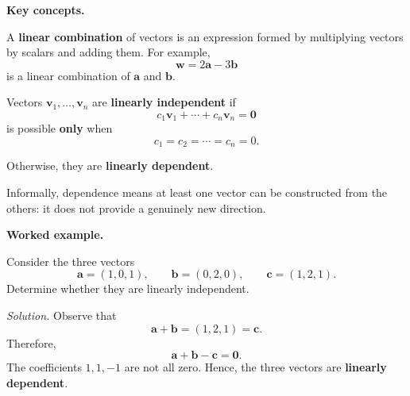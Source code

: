 \begingroup
\small

\noindent{}

\vspace{0.8em}

\noindent\textbf{Key concepts.}

A \textbf{linear combination} of vectors is an expression formed by
multiplying vectors by scalars and adding them.
For example,
\[
  \mathbf{w} = 2\mathbf{a} - 3\mathbf{b}
\]
is a linear combination of $\mathbf{a}$ and $\mathbf{b}$.

\vspace{0.4em}
Vectors $\mathbf{v}_1, \ldots, \mathbf{v}_n$ are
\textbf{linearly independent} if
\[
  \boxed{
  c_1 \mathbf{v}_1 + \cdots + c_n \mathbf{v}_n = \mathbf{0}
  }
\]
is possible \textbf{only} when
\[
  c_1 = c_2 = \cdots = c_n = 0.
\]

Otherwise, they are \textbf{linearly dependent}.

\vspace{0.4em}
Informally, dependence means at least one vector can be constructed
from the others: it does not provide a genuinely new direction.

\vspace{0.8em}
\noindent\textbf{Worked example.}

\noindent Consider the three vectors
\[
  \mathbf{a} = (1, 0, 1), \qquad
  \mathbf{b} = (0, 2, 0), \qquad
  \mathbf{c} = (1, 2, 1).
\]
Determine whether they are linearly independent.

\vspace{0.3em}
\noindent\textit{Solution.}
Observe that
\[
  \mathbf{a} + \mathbf{b} = (1, 2, 1) = \mathbf{c}.
\]
Therefore,
\[
  \boxed{\mathbf{a} + \mathbf{b} - \mathbf{c} = \mathbf{0}}.
\]
The coefficients $1, 1, -1$ are not all zero.
Hence, the three vectors are \textbf{linearly dependent}.

